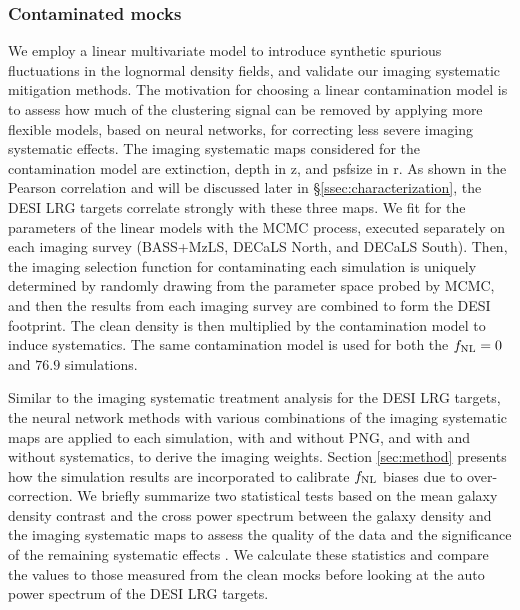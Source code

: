 \subsubsection{Contaminated mocks}
We employ a linear multivariate model to introduce synthetic spurious fluctuations in the lognormal density fields, and validate our imaging systematic mitigation methods. The motivation for choosing a linear contamination model is to assess how much of the clustering signal can be removed by applying more flexible models, based on neural networks, for correcting less severe imaging systematic effects. The imaging systematic maps considered for the contamination model are extinction, depth in z, and psfsize in r. As shown in the Pearson correlation and will be discussed later in \S \ref{ssec:characterization}, the DESI LRG targets correlate strongly with these three maps. We fit for the parameters of the linear models with the MCMC process, executed separately on each imaging survey (BASS+MzLS, DECaLS North, and DECaLS South). Then, the imaging selection function for contaminating each simulation is uniquely determined by randomly drawing from the parameter space probed by MCMC, and then the results from each imaging survey are combined to form the DESI footprint. The clean density is then multiplied by the contamination model to induce systematics.  The same contamination model is used for both the $f_{\rm NL}=0$ and $76.9$ simulations.

Similar to the imaging systematic treatment analysis for the DESI LRG targets, the neural network methods with various combinations of the imaging systematic maps are applied to each simulation, with and without PNG, and with and without systematics, to derive the imaging weights. Section \ref{sec:method} presents how the simulation results are incorporated to calibrate $f_{\rm NL}$ biases due to over-correction. We briefly summarize two statistical tests based on the mean galaxy density contrast and the cross power spectrum between the galaxy density and the imaging systematic maps to assess the quality of the data and the significance of the remaining systematic effects \cite[see, also,][]{rezaie2021primordial}. We calculate these statistics and compare the values to those measured from the clean mocks before looking at the auto power spectrum of the DESI LRG targets.
